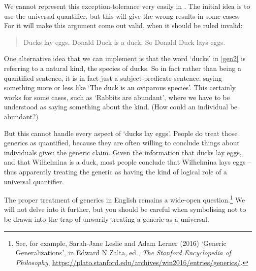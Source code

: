 We cannot represent this exception-tolerance very easily in \FOL. The initial idea is to use the universal quantifier, but this will give the wrong results in some cases. For it will make this argument come out valid, when it should be ruled invalid: \begin{quote}
Ducks lay eggs. Donald Duck is a duck. So Donald Duck lays eggs.
\end{quote} One alternative idea that we can implement is that the word `ducks' in \ref{gen2} is referring to a natural kind, the species of ducks. So in fact rather than being a quantified sentence, it is in fact just a subject-predicate sentence, saying something more or less like `The duck is an oviparous species'. This certainly works for some cases, such as `Rabbits are abundant', where we have to be understood as saying something about the kind. (How could an individual be abundant?) 

But this cannot handle every aspect of `ducks lay eggs'. People do treat those generics as quantified, because they are often willing to conclude things about individuals given the generic claim. Given the information that ducks lay eggs, and that Wilhelmina is a duck, most people conclude that Wilhelmina lays eggs – thus apparently treating the generic as having the kind of logical role of a universal quantifier.

The proper treatment of generics in English remains a wide-open question.\footnote{See, for example, Sarah-Jane Leslie and Adam Lerner (2016) `Generic Generalizations', in Edward N Zalta, ed., \emph{The Stanford Encyclopedia of Philosophy}, \url{https://plato.stanford.edu/archives/win2016/entries/generics/}.} We will not delve into it further, but you should be careful when symbolising not to be drawn into the trap of unwarily treating a generic as a universal.




